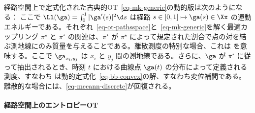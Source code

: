 経路空間上で定式化された古典的OT~\eqref{eq-mk-generic}の動的版は次のようになる：
ここで $\Ll(\ga) = \int_0^1 |\ga'(s)|^2 \d s$ は経路 $s \in [0,1] \mapsto \ga(s) \in \Xx$ の運動エネルギーである。それぞれ~\eqref{eq-ot-pathsspace}と~\eqref{eq-mk-generic}を解く最適カップリング $\pi^\star$ と $\bar\pi^\star$ の関連は、$\bar\pi^\star$ が $\pi^\star$ によって規定された割合で点の対を結ぶ測地線にのみ質量を与えることである。離散測度の特別な場合、これは
を意味する。ここで $\ga_{x_i,y_j}$ は $x_i$ と $y_j$ 間の測地線である。さらに、$\ga$ が $\bar\pi^\star$ に従って抽出されるとき、時刻 $t$ における曲線点 $\ga(t)$ の分布によって定義される測度、すなわち
は動的定式化~\eqref{eq-bb-convex}の解、すなわち変位補間である。
%
離散的な場合には、\eqref{eq-mccann-discrete}が回復される。

\paragraph{経路空間上のエントロピーOT}

